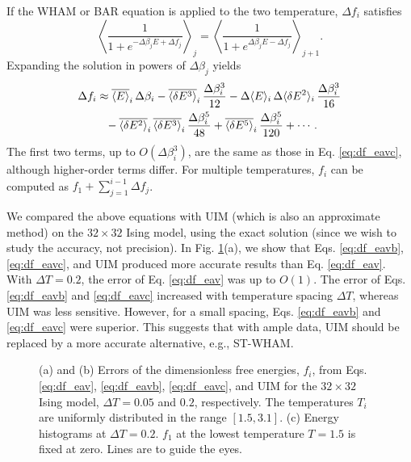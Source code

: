 \documentclass[reprint,aip,jcp,superscriptaddress]{revtex4-1}
\begin{document}
If the WHAM or BAR equation
is applied to the two temperature,
$\Delta f_i$ satisfies
%
\begin{equation*}
\left\langle
\frac{ 1 }
{ 1 + e^{-\Delta \beta_j E + \Delta f_j} }
\right\rangle_j
=
\left\langle
\frac{ 1 }
{ 1 + e^{\Delta \beta_j E - \Delta f_j} }
\right\rangle_{j+1}.
\end{equation*}
%
Expanding the solution
in powers of $\Delta \beta_j$
yields
\begin{align}
\Delta f_i
&
\approx
\overline{ \langle E \rangle }_i \, \Delta \beta_i
%
-\overline{ \langle \delta E^3 \rangle }_i
\, \frac{ \Delta \beta_i^3 } { 12 }
%
-\Delta \langle E \rangle_i
\, \Delta \langle \delta E^2 \rangle_i
\, \frac{ \Delta \beta_i^3 } { 16 }
\notag \\
&
\phantom{\approx}
%
-\overline{ \langle \delta E^2 \rangle }_i
\, \overline{ \langle \delta E^3 \rangle }_i
\, \frac{ \Delta \beta_i^5 } { 48 }
%
+\overline{ \langle \delta E^5 \rangle }_i
\, \frac{ \Delta \beta_i^5 } { 120 }
+ \cdots.
\notag
\end{align}
%
The first two terms, up to $O(\Delta \beta_i^3)$,
are the same as those in Eq. \eqref{eq:df_eavc},
although higher-order terms differ.
%
For multiple temperatures, $f_i$
can be computed as
$f_1 + \sum_{j = 1}^{i - 1} \Delta f_j$.
%



We compared the above equations
with UIM\cite{kastner2005, *kastner2009}
(which is also an approximate method)
on the $32\times 32$ Ising model,
%
using the exact solution\cite{
ferdinand1969}
(since we wish to study
the accuracy, not precision).
%
In Fig. \ref{fig:is2approx}(a),
we show that
Eqs. \eqref{eq:df_eavb},
\eqref{eq:df_eavc},
and UIM
produced more accurate results than
Eq. \eqref{eq:df_eav}.
%
With $\Delta T = 0.2$,
the error of Eq. \eqref{eq:df_eav}
was up to $O(1)$.
%
The error of
Eqs. \eqref{eq:df_eavb} and \eqref{eq:df_eavc}
increased with temperature spacing $\Delta T$,
whereas
UIM was less sensitive.
%
However, for a small spacing,
Eqs. \eqref{eq:df_eavb} and \eqref{eq:df_eavc}
were superior.
%
This suggests that with ample data,
UIM should be replaced
by a more accurate alternative, e.g., ST-WHAM.



\begin{figure}[h]
  \caption{
    \label{fig:is2approx}
    (a) and (b) Errors of the dimensionless free energies, $f_i$,
    from Eqs. \eqref{eq:df_eav}, \eqref{eq:df_eavb}, \eqref{eq:df_eavc},
    and UIM for the $32\times 32$ Ising model,
    $\Delta T = 0.05$ and $0.2$, respectively.
    The temperatures $T_i$ are uniformly distributed
    in the range $[1.5, 3.1]$.
    (c) Energy histograms at $\Delta T = 0.2$.
    $f_1$ at the lowest temperature $T = 1.5$ is fixed at zero.
    Lines are to guide the eyes.
  }
\end{figure}
\end{document}
